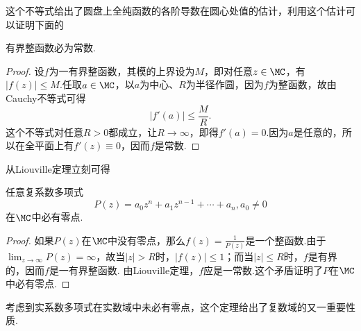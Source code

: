 这个不等式给出了圆盘上全纯函数的各阶导数在圆心处值的估计，利用这个估计可以证明下面的
\begin{theorem}\label{thm3.5.2}
有界整函数必为常数.
\end{theorem}
\begin{proof}
设$f$为一有界整函数，其模的上界设为$M$，即对任意$z\in\MC$，有$|f(z)|\le M$.任取$a\in\MC$，以$a$为中心、$R$为半径作圆，因为$f$为整函数，故由Cauchy不等式可得
\[|f'(a)|\le\frac MR.\]
这个不等式对任意$R>0$都成立，让$R\to\infty$，即得$f'(a)=0$.因为$a$是任意的，所以在全平面上有$f'(z)\equiv0$，因而$f$是常数.
\end{proof}

从Liouville定理立刻可得
\begin{theorem}\label{thm3.5.3}
任意复系数多项式
\[P(z)=a_0z^n+a_1z^{n-1}+\cdots+a_n,a_0\ne0\]
在$\MC$中必有零点.
\end{theorem}
\begin{proof}
如果$P(z)$在$\MC$中没有零点，那么$f(z)=\frac1{P(z)}$是一个整函数.由于$\lim_{z\to\infty}P(z)=\infty$，故当$|z|>R$时，$|f(z)|\le1$；而当$|z|\le R$时，$f$是有界的，因而$f$是一有界整函数. 由Liouville定理，$f$应是一常数.这个矛盾证明了$P$在$\MC$中必有零点.
\end{proof}

考虑到实系数多项式在实数域中未必有零点，这个定理给出了复数域的又一重要性质.

